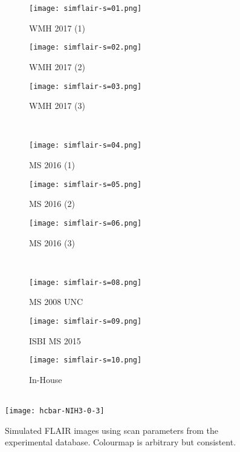 \begin{figure}
  \centering
  \begin{subfigure}{0.25\textwidth}
    \centering\texttt{[image: simflair-s=01.png]}
    \caption{WMH 2017 (1)}
  \end{subfigure}
  \begin{subfigure}{0.25\textwidth}
    \centering\texttt{[image: simflair-s=02.png]}
    \caption{WMH 2017 (2)}
  \end{subfigure}
  \begin{subfigure}{0.25\textwidth}
    \centering\texttt{[image: simflair-s=03.png]}
    \caption{WMH 2017 (3)}
  \end{subfigure}\\[0.5em]
  \begin{subfigure}{0.25\textwidth}
    \centering\texttt{[image: simflair-s=04.png]}
    \caption{MS  2016 (1)}
  \end{subfigure}
  \begin{subfigure}{0.25\textwidth}
    \centering\texttt{[image: simflair-s=05.png]}
    \caption{MS  2016 (2)}
  \end{subfigure}
  \begin{subfigure}{0.25\textwidth}
    \centering\texttt{[image: simflair-s=06.png]}
    \caption{MS  2016 (3)}
  \end{subfigure}\\[0.5em]
  \begin{subfigure}{0.25\textwidth}
    \centering\texttt{[image: simflair-s=08.png]}
    \caption{MS  2008 UNC}
  \end{subfigure}
  \begin{subfigure}{0.25\textwidth}
    \centering\texttt{[image: simflair-s=09.png]}
    \caption{ISBI MS 2015}
  \end{subfigure}
  \begin{subfigure}{0.25\textwidth}
    \centering\texttt{[image: simflair-s=10.png]}
    \caption{In-House}
  \end{subfigure}\\[0.5em]
  \texttt{[image: hcbar-NIH3-0-3]}
  \caption{Simulated FLAIR images using scan parameters from the experimental database.
    Colourmap is arbitrary but consistent.}%
  \label{fig:simflair}
\end{figure}
